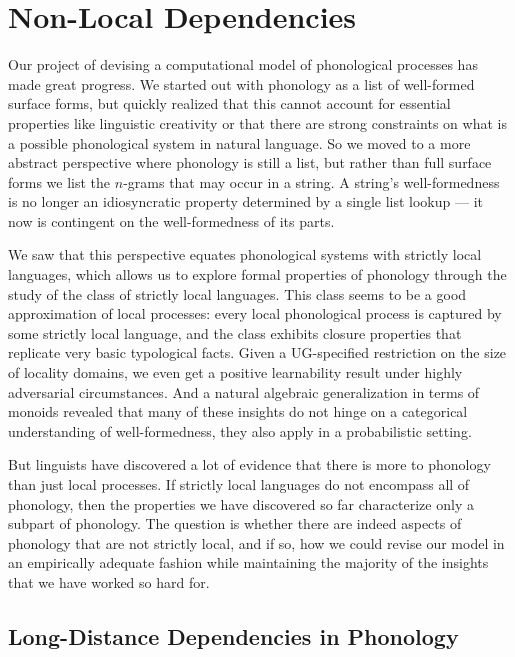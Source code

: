 \chapter{Non-Local Dependencies}
\label{cha:SP}

Our project of devising a computational model of phonological processes has made great progress.
We started out with phonology as a list of well-formed surface forms, but quickly realized that this cannot account for essential properties like linguistic creativity or that there are strong constraints on what is a possible phonological system in natural language.
So we moved to a more abstract perspective where phonology is still a list, but rather than full surface forms we list the $n$-grams that may occur in a string.
A string's well-formedness is no longer an idiosyncratic property determined by a single list lookup --- it now is contingent on the well-formedness of its parts.

We saw that this perspective equates phonological systems with strictly local languages, which allows us to explore formal properties of phonology through the study of the class of strictly local languages.
This class seems to be a good approximation of local processes: every local phonological process is captured by some strictly local language, and the class exhibits closure properties that replicate very basic typological facts.
Given a UG-specified restriction on the size of locality domains, we even get a positive learnability result under highly adversarial circumstances.
And a natural algebraic generalization in terms of monoids revealed that many of these insights do not hinge on a categorical understanding of well-formedness, they also apply in a probabilistic setting.

But linguists have discovered a lot of evidence that there is more to phonology than just local processes.
If strictly local languages do not encompass all of phonology, then the properties we have discovered so far characterize only a subpart of phonology.
The question is whether there are indeed aspects of phonology that are not strictly local, and if so, how we could revise our model in an empirically adequate fashion while maintaining the majority of the insights that we have worked so hard for.

\section{Long-Distance Dependencies in Phonology}

